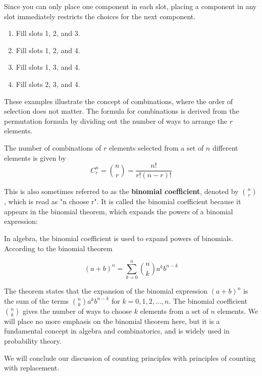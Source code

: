 \begin{solution}
    Since you can only place one component in each slot, placing a component in any slot immediately restricts the choices for the next component.
        
    \begin{enumerate}
        \item Fill slots 1, 2, and 3.
        \item Fill slots 1, 2, and 4.
        \item Fill slots 1, 3, and 4.
        \item Fill slots 2, 3, and 4.
    \end{enumerate}
\end{solution}

These examples illustrate the concept of combinations, where the order of selection does not matter. The formula for combinations is derived from the permutation formula by dividing out the number of ways to arrange the $r$ elements.

\begin{theorem}[Combinations]
    The number of combinations of $r$ elements selected from a set of $n$ different elements is given by
    \[
    C_r^n = \binom{n}{r} = \frac{n!}{r!(n-r)!}
    \]
\end{theorem}

This is also sometimes referred to as the \textbf{binomial coefficient}, denoted by $\binom{n}{r}$, which is read as "n choose r". It is called the binomial coefficient because it appears in the binomial theorem, which expands the powers of a binomial expression:

\begin{theorem}
    In algebra, the binomial coefficient is used to expand powers of binomials. According to the binomial theorem

$$
(a+b)^n=\sum_{k=0}^n\binom{n}{k} a^k b^{n-k}
$$

\end{theorem}

The theorem states that the expansion of the binomial expression $(a+b)^n$ is the sum of the terms $\binom{n}{k} a^k b^{n-k}$ for $k=0,1,2,\ldots,n$. The binomial coefficient $\binom{n}{k}$ gives the number of ways to choose $k$ elements from a set of $n$ elements. We will place no more emphasis on the binomial theorem here, but it is a fundamental concept in algebra and combinatorics, and is widely used in probability theory.

We will conclude our discussion of counting principles with principles of counting with replacement.

